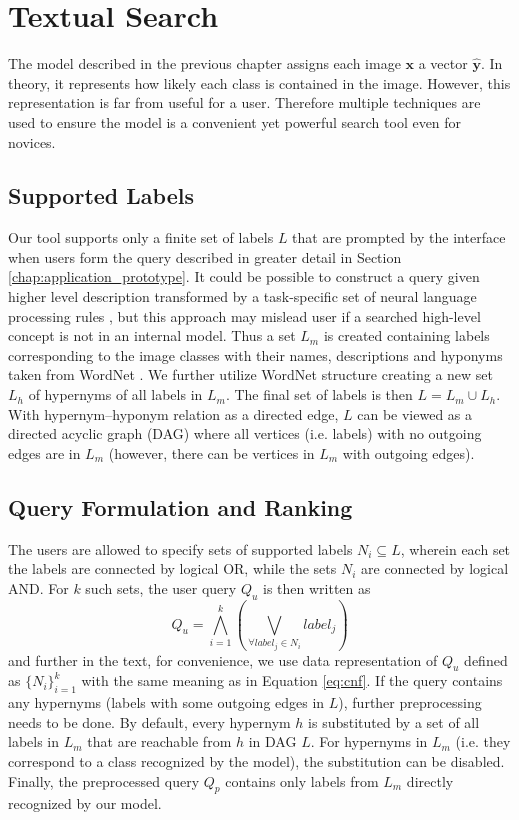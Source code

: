 \chapter{Textual Search}\label{chap:text_search}

The model described in the previous chapter assigns each image $\bm{x}$ a vector $\bm{\hat{y}}$. In theory, it represents how likely each class is contained in the image. However, this representation is far from useful for a user. Therefore multiple techniques are used to ensure the model is a convenient yet powerful search tool even for novices.

\section{Supported Labels}
Our tool supports only a finite set of labels $L$ that are prompted by the interface when users form the query described in greater detail in Section \ref{chap:application_prototype}. It could be possible to construct a query given higher level description transformed by a task-specific set of neural language processing rules \cite{moumtzidou2017verge}, but this approach may mislead user if a searched high-level concept is not in an internal model. Thus a set $L_m$ is created containing labels corresponding to the image classes with their names, descriptions and hyponyms taken from WordNet \cite{WordNet}. We further utilize WordNet structure creating a new set $L_h$ of hypernyms of all labels in $L_m$. The final set of labels is then $L=L_m\cup L_h$. With hypernym--hyponym relation as a directed edge, $L$ can be viewed as a directed acyclic graph (DAG) where all vertices (i.e. labels) with no outgoing edges are in $L_m$ (however, there can be vertices in $L_m$ with outgoing edges).

\section{Query Formulation and Ranking}\label{sec:query_formulation_and_ranking}
The users are allowed to specify sets of supported labels $N_i \subseteq L$, wherein each set the labels are connected by logical \textsf{OR}, while the sets $N_i$ are connected by logical \textsf{AND}. For $k$ such sets, the user query $Q_u$ is then written as
\begin{equation}
	Q_u=\bigwedge\limits_{i=1}^k\left(\bigvee\limits_{\forall label_j\in N_i} label_j \right)\label{eq:cnf}
\end{equation}
and further in the text, for convenience, we use data representation of $Q_u$ defined as $\{N_i\}_{i=1}^k$ with the same meaning as in Equation \ref{eq:cnf}. If the query contains any hypernyms (labels with some outgoing edges in $L$), further preprocessing needs to be done. By default, every hypernym $h$ is substituted by a set of all labels in $L_m$ that are reachable from $h$ in DAG $L$. For hypernyms in $L_m$ (i.e. they correspond to a class recognized by the model), the substitution can be disabled. Finally, the preprocessed query $Q_p$ contains only labels from $L_m$ directly recognized by our model.


